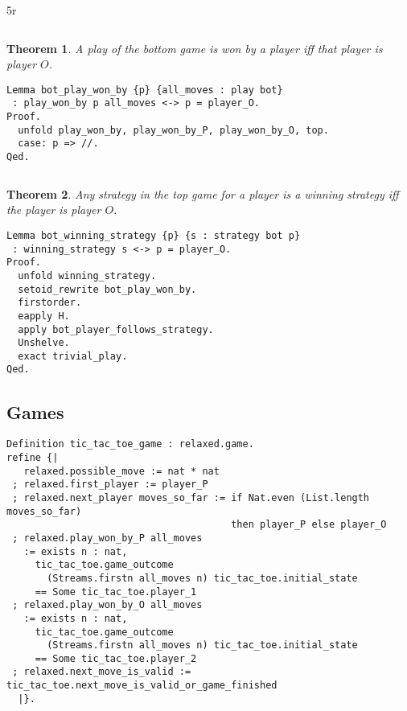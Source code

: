 5r\documentclass{article}
\newtheorem{thm}{Theorem}
\theoremstyle{definition}
\begin{document}
$\left.\right.$

\begin{thm}
A play of the bottom game is won by a player iff that player is player $O$.
\end{thm}

\begin{verbatim}
Lemma bot_play_won_by {p} {all_moves : play bot}
 : play_won_by p all_moves <-> p = player_O.
Proof.
  unfold play_won_by, play_won_by_P, play_won_by_O, top.
  case: p => //.
Qed.
\end{verbatim}
$\left.\right.$

\begin{thm}
Any strategy in the top game for a player is a winning strategy iff the player is player $O$. 
\end{thm}

\begin{verbatim}
Lemma bot_winning_strategy {p} {s : strategy bot p}
 : winning_strategy s <-> p = player_O.
Proof.
  unfold winning_strategy.
  setoid_rewrite bot_play_won_by.
  firstorder.
  eapply H.
  apply bot_player_follows_strategy.
  Unshelve.
  exact trivial_play.
Qed. 
\end{verbatim}
\subsection{Games}

\begin{verbatim}
Definition tic_tac_toe_game : relaxed.game.
refine {|
   relaxed.possible_move := nat * nat
 ; relaxed.first_player := player_P
 ; relaxed.next_player moves_so_far := if Nat.even (List.length moves_so_far) 
                                       then player_P else player_O
 ; relaxed.play_won_by_P all_moves 
   := exists n : nat,
     tic_tac_toe.game_outcome
       (Streams.firstn all_moves n) tic_tac_toe.initial_state
     == Some tic_tac_toe.player_1
 ; relaxed.play_won_by_O all_moves 
   := exists n : nat,
     tic_tac_toe.game_outcome
       (Streams.firstn all_moves n) tic_tac_toe.initial_state
     == Some tic_tac_toe.player_2
 ; relaxed.next_move_is_valid := tic_tac_toe.next_move_is_valid_or_game_finished
  |}.
\end{verbatim}
\end{document}
